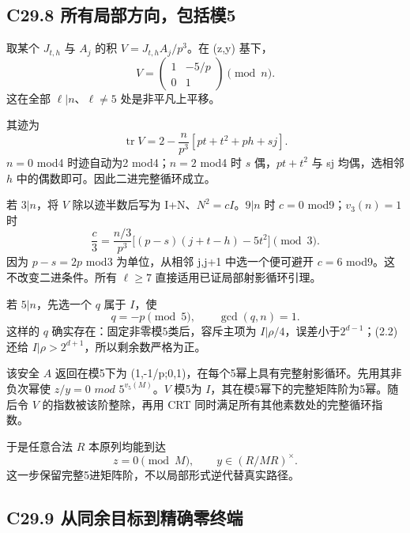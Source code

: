 \documentclass[11pt,a4paper]{article}
\theoremstyle{definition}
\numberwithin{equation}{section}
\begin{document}
\subsection*{\texorpdfstring{{C29.8} {所有局部方向，包括模5}}{C29.8 所有局部方向，包括模5}}\label{C29-h191}

{取某个} {\ensuremath{J_{t,h}}} {与} {\ensuremath{A_{j}}} {的积} {\ensuremath{V=J_{t,h}A_{j}/p^{3}}。在} {(z,y)} {基下，} \[
V=\begin{pmatrix}1&-5/p\\0&1\end{pmatrix}\pmod n.
\tag{C29.8.1}
\] {这在全部} {\ensuremath{\ell |n}、\ensuremath{\ell \ne 5}} {处是非平凡上平移。}

{其迹为} \[
\operatorname{tr}V=
2-\frac n{p^3}[pt+t^2+ph+sj].
\tag{C29.8.2}
\] {\ensuremath{n=0}} {mod4} {时迹自动为2} {mod4；\ensuremath{n=2}} {mod4} {时} {\ensuremath{s}} {偶，\ensuremath{pt+t^{2}}} {与} {sj} {均偶，选相邻} {\ensuremath{h}} {中的偶数即可。因此二进完整循环成立。}

{若} {\ensuremath{3|n}，将} {\ensuremath{V}} {除以迹半数后写为} {I+N、\ensuremath{N^{2}=cI}。\ensuremath{9|n}} {时} {\ensuremath{c=0}} {mod9；\ensuremath{v_{3}(n)=1}} {时} \[
\frac c3=
\frac{n/3}{p^3}
\bigl[(p-s)(j+t-h)-5t^2\bigr]\pmod3.
\tag{C29.8.3}
\] {因为} {\ensuremath{p-s=2p}} {mod3} {为单位，从相邻} {j,j+1} {中选一个便可避开} {\ensuremath{c=6}} {mod9。这不改变二进条件。所有} {\ensuremath{\ell \ge 7}} {直接适用已证局部射影循环引理。}

{若} {\ensuremath{5|n}，先选一个} {\ensuremath{q}} {属于} {\ensuremath{I}，使} \[
q=-p\pmod5,\qquad\gcd(q,n)=1.
\tag{C29.8.4}
\] {这样的} {\ensuremath{q}} {确实存在：固定非零模5类后，容斥主项为} {\textbar{}\ensuremath{I|\rho /4}，误差小于\ensuremath{2^{d-1}}；(2.2)} {还给} {\textbar{}\ensuremath{I|\rho >2^{d+1}}，所以剩余数严格为正。}

{该安全} {\ensuremath{A}} {返回在模5下为} {(1,-1/p;0,1)，在每个5幂上具有完整射影循环。先用其非负次幂使} {\ensuremath{z/y=0}} {\ensuremath{mod}} {\ensuremath{5^{v_{5}(M)}}。\ensuremath{V}} {模5为} {\ensuremath{I}，其在模5幂下的完整矩阵阶为5幂。随后令} {\ensuremath{V}} {的指数被该阶整除，再用} {CRT} {同时满足所有其他素数处的完整循环指数。}

{于是任意合法} {\ensuremath{R}} {本原列均能到达} \[
z=0\pmod M,\qquad y\in(R/MR)^\times.
\tag{C29.8.5}
\] {这一步保留完整5进矩阵阶，不以局部形式逆代替真实路径。}

\subsection*{\texorpdfstring{{C29.9} {从同余目标到精确零终端}}{C29.9 从同余目标到精确零终端}}\label{C29-h192}
\end{document}
